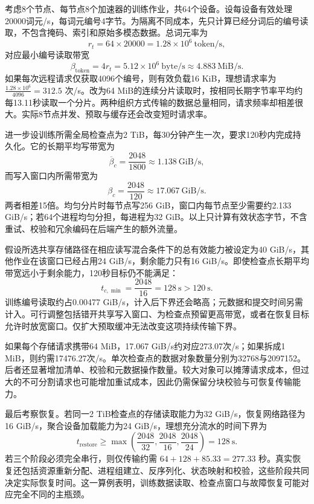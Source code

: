 \documentclass[../textbook.tex]{subfiles}
\begin{document}
\begin{example}[存储吞吐量测算]


考虑8个节点、每节点8个加速器的训练作业，共64个设备。设每设备有效处理20000词元/s，每词元编号4字节。为隔离不同成本，先只计算已经分词后的编号读取，不包含掩码、索引和原始多模态数据。总词元率为
\begin{equation*}
 r_t=64\times20000=1.28\times10^6\ \mathrm{token/s},
\end{equation*}
对应最小编号读取带宽
\begin{equation*}
 \beta_{\mathrm{token}}=4r_t=5.12\times10^6\ \mathrm{byte/s}
 \approx4.883\ \mathrm{MiB/s}.
\end{equation*}
如果每次远程请求仅获取4096个编号，则有效负载16 KiB，理想请求率为 $\frac{1.28\times10^6}{4096}=312.5$ 次/s。改为64 MiB的连续分片读取时，按相同长期字节率平均约每13.11秒读取一个分片。两种组织方式传输的数据总量相同，请求频率却相差很大。实际8节点并发、预取与缓存还会改变短时请求率。

进一步设训练所需全局检查点为2 TiB，每30分钟产生一次，要求120秒内完成持久化。它的长期平均写带宽为
\begin{equation*}
 \overline\beta_c=\frac{2048}{1800}\approx1.138\ \mathrm{GiB/s},
\end{equation*}
而写入窗口内所需带宽为
\begin{equation*}
 \beta_c=\frac{2048}{120}\approx17.067\ \mathrm{GiB/s}.
\end{equation*}
两者相差15倍。均匀分片时每节点写256 GiB，窗口内每节点至少需要约2.133 GiB/s；若64个进程均匀分担，每进程为32 GiB。以上只计算有效状态字节，不含重试、校验和冗余编码在后端产生的额外流量。

假设所选共享存储路径在相应读写混合条件下的总有效能力被设定为40 GiB/s，其他作业在该窗口已经占用24 GiB/s，剩余能力只有16 GiB/s。即使检查点长期平均带宽远小于剩余能力，120秒目标仍不能满足：
\begin{equation*}
 t_{c,\min}=\frac{2048}{16}=128\ \mathrm{s}>120\ \mathrm{s}.
\end{equation*}
训练编号读取约占0.00477 GiB/s，计入后下界还会略高；元数据和提交时间另需计入。可行调整包括错开共享写入窗口、为检查点预留更高带宽，或者在恢复目标允许时放宽窗口。仅扩大预取缓冲无法改变这项持续传输下界。

如果每个存储请求携带64 MiB，17.067 GiB/s约对应273.07次/s；如果拆成1 MiB，则约需17476.27次/s。单次检查点的数据对象数量分别为32768与2097152。后者还显著增加清单、校验和元数据操作数量。较大对象可以摊薄请求成本，但过大的不可分割请求也可能增加重试成本，因此仍需保留分块校验与可恢复传输能力。

最后考察恢复。若同一2 TiB检查点的存储读取能力为32 GiB/s，恢复网络路径为16 GiB/s，聚合设备加载能力为24 GiB/s，理想充分流水的时间下界为
\begin{equation*}
 t_{\mathrm{restore}}\geq
 \max\left(\frac{2048}{32},\frac{2048}{16},\frac{2048}{24}\right)
 =128\ \mathrm{s}.
\end{equation*}
若三个阶段必须完全串行，则仅传输约需 $64+128+85.33=277.33$ 秒。真实恢复还包括资源重新分配、进程组建立、反序列化、状态映射和校验，这些阶段共同决定实际恢复时间。这一算例表明，训练数据读取、检查点窗口与故障恢复可能对应完全不同的主瓶颈。
\end{example}
\end{document}
